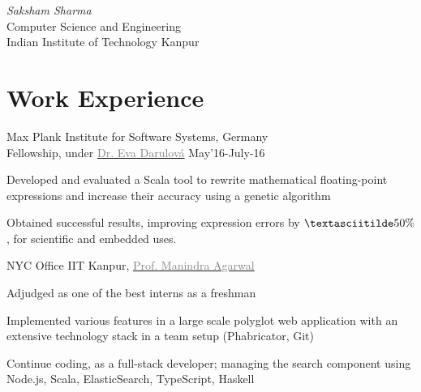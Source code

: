 \documentclass{tccv}
\begin{document}
{ \textit{Saksham \textcolor{myred}{Sharma}}}
\medskip\\
\large{Computer Science and Engineering}\\
{Indian Institute of Technology Kanpur}

\vspace{-0.5cm}
\section{Work Experience}
\begin{experience}

  {Max Plank Institute for Software Systems, \small{Germany}\\
  Fellowship, under
  \href{http://www.mpi-sws.org/~eva}{\textcolor{gray}{Dr. Eva
      Darulová}}
  \hfill May'16-July-16}
  {
  \item Developed and evaluated a Scala tool to rewrite
    mathematical floating-point expressions and increase their
    accuracy using a genetic algorithm
  \item Obtained successful results, improving expression errors by
    $\textasciitilde50\%$, for scientific and embedded uses.
  }

  {NYC Office IIT Kanpur,
    \href{http://cse.iitk.ac.in/~manindra}{\textcolor{gray}{Prof. Manindra Agarwal}}}
  {
  \item Adjudged as one of the best interns as a freshman
  \item Implemented various features in a large scale polyglot web
    application with an extensive technology stack in a team setup
    (Phabricator, Git)
  \item Continue coding, as a full-stack developer;
    managing the search component using Node.js, Scala, ElasticSearch,
    TypeScript, Haskell
  }
\end{experience}

\vspace{-0.5cm}
\end{document}
